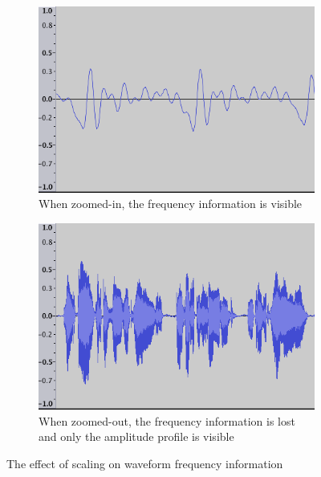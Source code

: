 \begin{figure}[p]
\centering
\begin{subfigure}{.5\textwidth}
  \centering
  \includegraphics[width=.9\linewidth]{figs/waveform-zoomin.png}
  \caption{When zoomed-in, the frequency information is visible}
  \label{fig:waveform-zoomin}
\end{subfigure}%
\begin{subfigure}{.5\textwidth}
  \centering
  \includegraphics[width=.9\linewidth]{figs/waveform-zoomout.png}
  \caption{When zoomed-out, the frequency information is lost and only the amplitude profile is visible}
  \label{fig:waveform-zoomout}
\end{subfigure}
\caption{The effect of scaling on waveform frequency information}
\label{fig:waveforms}
\end{figure}

